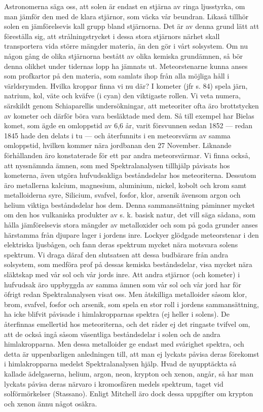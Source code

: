\documentclass[a4paper, 12pt, oneside, swedish]{article}
\begin{document}
Astronomerna säga oss, att solen är endast en stjärna av ringa ljusstyrka, om man jämför den med de klara stjärnor, som väcka vår beundran. Likaså tillhör solen en jämförelsevis kall grupp bland stjärnorna. Det är av denna grund lätt att föreställa sig, att strålningstrycket i dessa stora stjärnors närhet skall transportera vida större mängder materia, än den gör i vårt solsystem. Om nu någon gång de olika stjärnorna bestått av olika kemiska grundämnen, så bör denna olikhet under tidernas lopp ha jämnats ut. Meteorstenarne kunna anses som profkartor på den materia, som samlats ihop från alla möjliga håll i världsrymden. Hvilka kroppar finna vi nu där? I kometer (jfr s. 84) spela järn, natrium, kol, väte och kväfve (i cyan) den viktigaste rollen. Vi veta numera, särskildt genom Schiaparellis undersökningar, att meteoriter ofta äro brottstycken av kometer och därför böra vara besläktade med dem. Så till exempel har Bielas komet, som ägde en omloppstid av 6,6 år, varit försvunnen sedan 1852 --- redan 1845 hade den delats i tu --- och återfunnits i en meteorsvärm av samma omloppstid, hvilken kommer nära jordbanan den 27 November. Liknande förhållanden äro konstaterade för ett par andra meteorsvärmar. Vi finna också, att nyssnämnda ämnen, som med Spektralanalysen tillhjälp påvisats hos kometerna, även utgöra hufvudsakliga beståndsdelar hos meteoriterna. Dessutom äro metallerna kalcium, magnesium, aluminium, nickel, kobolt och krom samt metalloiderna syre, Silicium, svafvel, fosfor, klor, arsenik ävensom argon och helium viktiga beståndsdelar hos dem. Denna sammansättning påminner mycket om den hos vulkaniska produkter av s. k. basisk natur, det vill säga sådana, som hålla jämförelsevis stora mängder av metalloxider och som på goda grunder anses härstamma från djupare lager i jordens inre. Lockyer glödgade meteorstenar i den elektriska ljusbågen, och fann deras spektrum mycket nära motsvara solens spektrum. Vi draga däraf den slutsatsen att dessa budbärare från andra solsystem, som medföra prof på dessas kemiska beståndsdelar, visa mycket nära släktskap med vår sol och vår jords inre. Att andra stjärnor (och kometer) i hufvudsak äro uppbyggda av samma ämnen som vår sol och vår jord har för öfrigt redan Spektralanalysen visat oss. Men åtskilliga metalloider såsom klor, brom, svafvel, fosfor och arsenik, som spela en stor roll i jordens sammansättning, ha icke blifvit påvisade i himlakropparnas spektra (ej heller i solens). De återfinnas emellertid hos meteoriterna, och det råder ej det ringaste tvifvel om, att de också ingå såsom väsentliga beståndsdelar i solen och de andra himlakropparna. Men dessa metalloider ge endast med svårighet spektra, och detta är uppenbarligen anledningen till, att man ej lyckats påvisa deras förekomst i himlakropparna medelst Spektralanalysen hjälp. Hvad de nyupptäckta så kallade ädelgaserna, helium, argon, neon, krypton och xenon, angår, så har man lyckats påvisa deras närvaro i kromosfären medels spektrum, taget vid solförmörkelser (Stassano). Enligt Mitchell äro dock dessa uppgifter om krypton och xenon ännu något osäkra.
\end{document}

